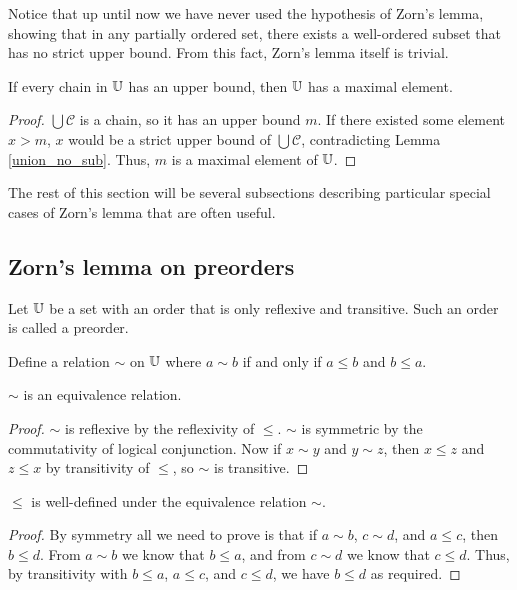 \documentclass[../../math.tex]{subfiles}
\begin{document}
Notice that up until now we have never used the hypothesis of Zorn's lemma,
showing that in any partially ordered set, there exists a well-ordered subset
that has no strict upper bound.  From this fact, Zorn's lemma itself is trivial.

\begin{theorem} \label{zorn}
    If every chain in $\mathbb{U}$ has an upper bound, then $\mathbb{U}$ has a maximal element.
\end{theorem}
\begin{proof}
    $\bigcup \mathcal C$ is a chain, so it has an upper bound $m$.  If there
    existed some element $x > m$, $x$ would be a strict upper bound of $\bigcup
    \mathcal C$, contradicting Lemma \ref{union_no_sub}.  Thus, $m$ is a maximal
    element of $\mathbb{U}$.
\end{proof}

The rest of this section will be several subsections describing particular
special cases of Zorn's lemma that are often useful.

\subsection{Zorn's lemma on preorders}

Let $\mathbb{U}$ be a set with an order that is only reflexive and transitive.  Such an
order is called a preorder.

\begin{definition}
    Define a relation $\sim$ on $\mathbb{U}$ where $a \sim b$ if and only if $a \leq b$
    and $b \leq a$.
\end{definition}

\begin{instance}
    $\sim$ is an equivalence relation.
\end{instance}
\begin{proof}
    $\sim$ is reflexive by the reflexivity of $\leq$.  $\sim$ is symmetric by
    the commutativity of logical conjunction.  Now if $x \sim y$ and $y \sim z$,
    then $x \leq z$ and $z \leq x$ by transitivity of $\leq$, so $\sim$ is
    transitive.
\end{proof}

\begin{lemma}
    $\leq$ is well-defined under the equivalence relation $\sim$.
\end{lemma}
\begin{proof}
    By symmetry all we need to prove is that if $a \sim b$, $c \sim d$, and $a
    \leq c$, then $b \leq d$.  From $a \sim b$ we know that $b \leq a$, and from
    $c \sim d$ we know that $c \leq d$.  Thus, by transitivity with $b \leq a$,
    $a \leq c$, and $c \leq d$, we have $b \leq d$ as required.
\end{proof}
\end{document}
